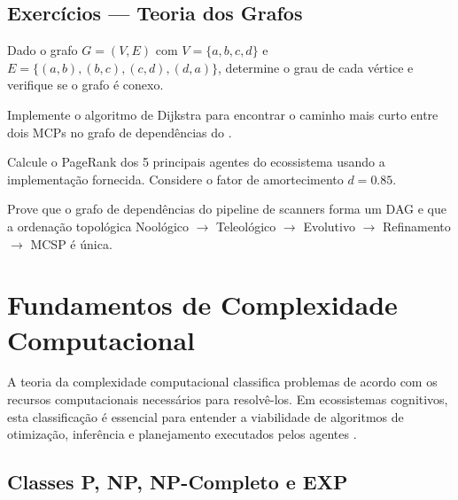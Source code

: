 \subsection{Exercícios — Teoria dos Grafos}

\begin{exercicio}
    Dado o grafo $G = (V, E)$ com $V = \{a, b, c, d\}$ e
    $E = \{(a,b), (b,c), (c,d), (d,a)\}$, determine o grau de cada vértice
    e verifique se o grafo é conexo.
\end{exercicio}

\begin{exercicio}
    Implemente o algoritmo de Dijkstra para encontrar o caminho mais curto
    entre dois MCPs no grafo de dependências do \opencodeeco{}.
\end{exercicio}

\begin{exercicio}
    Calcule o PageRank dos 5 principais agentes do ecossistema usando a
    implementação fornecida. Considere o fator de amortecimento $d = 0.85$.
\end{exercicio}

\begin{exercicio}
    Prove que o grafo de dependências do pipeline de scanners forma um DAG
    e que a ordenação topológica Noológico $\to$ Teleológico $\to$ Evolutivo
    $\to$ Refinamento $\to$ MCSP é única.
\end{exercicio}

\section{Fundamentos de Complexidade Computacional}
\label{sec:complexidade}
\nivelphd

A teoria da complexidade computacional classifica problemas de acordo com
os recursos computacionais necessários para resolvê-los. Em ecossistemas
cognitivos, esta classificação é essencial para entender a viabilidade de
algoritmos de otimização, inferência e planejamento executados pelos agentes
\cite{russell2020inteligencia, wooldridge2009multiagent}.

\subsection{Classes P, NP, NP-Completo e EXP}

